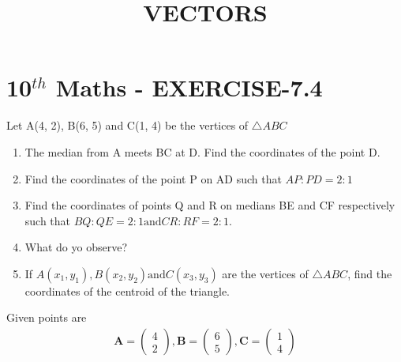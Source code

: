 \documentclass[12pt]{article}
\newcommand{\myvec}[1]{\ensuremath{\begin{pmatrix}#1\end{pmatrix}}}
\let\vec\mathbf
\begin{document}
\begin{center}
\title{\textbf{VECTORS}}
\date{\vspace{-5ex}} %
\maketitle
\end{center}

\section{10$^{th}$ Maths - EXERCISE-7.4}

Let A(4, 2), B(6, 5) and C(1, 4) be the vertices of $\triangle ABC$
\begin{enumerate}
\item The median from A meets BC at D. Find the coordinates of the point D.
\item Find the coordinates of the point P on AD such that $AP : PD = 2 : 1$
\item Find the coordinates of points Q and R on medians BE and CF respectively such
that $BQ : QE = 2 : 1 \text{and} CR : RF = 2 : 1.$
\item What do yo observe?
\item If $A(x_1, y_1), B(x_2, y_2) \text{and} C(x_3, y_3)$ are the vertices of $\triangle ABC$, find the coordinates of the centroid of the triangle.
\end{enumerate}

Given points are
\begin{align}
\vec{A}=\myvec{4\\ 2} ,
\vec{B}=\myvec{6\\ 5} ,
\vec{C}=\myvec{1\\ 4}
\end{align}
\end{document}

